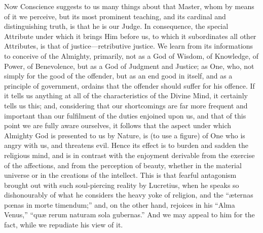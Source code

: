 Now Conscience suggests to us many things about that Master, whom
by means of it we perceive, but its most prominent teaching, and its
cardinal and distinguishing truth, is that he is our Judge. In
consequence, the special Attribute under which it brings Him before
us, to which it subordinates all other Attributes, is that of
justice—retributive justice. We learn from its informations to
conceive of the Almighty, primarily, not as a God of Wisdom, of
Knowledge, of Power, of Benevolence, but as a God of Judgment and
Justice; as One, who, not simply for the good of the offender, but as
an end good in itself, and as a principle of government, ordains that
the offender should suffer for his offence. If it tells us anything at
all of the characteristics of the Divine Mind, it certainly tells us
this; and, considering that our shortcomings are far more frequent and
important than our fulfilment of the duties enjoined upon us, and that
of this point we are fully aware ourselves, it follows that the aspect
under which Almighty God is presented to us by Nature, is (to use a
figure) of One who is angry with us, and threatens evil. Hence its
effect is to burden and sadden the religious mind, and is in contrast
with the enjoyment derivable from the exercise of the affections, and
from the perception of beauty, whether in the material universe or in
the creations of the intellect. This is that fearful antagonism
brought out with such soul-piercing reality by Lucretius, when he
speaks so dishonourably of what he considers the heavy yoke of
religion, and the ``æternas pœnas in morte timendum;'' and,
on the other hand, rejoices in his ``Alma Venus,'' ``quæ
rerum naturam sola gubernas.'' And we may appeal to him for the
fact, while we repudiate his view of it.

